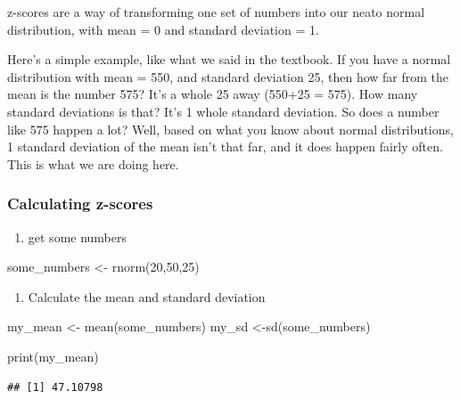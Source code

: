 \documentclass[
]{book}
\newenvironment{Shaded}{\begin{snugshade}}{\end{snugshade}}
\newcommand{\DecValTok}[1]{\textcolor[rgb]{0.00,0.00,0.81}{#1}}
\newcommand{\FunctionTok}[1]{\textcolor[rgb]{0.00,0.00,0.00}{#1}}
\newcommand{\NormalTok}[1]{#1}
\newcommand{\OtherTok}[1]{\textcolor[rgb]{0.56,0.35,0.01}{#1}}
\providecommand{\tightlist}{%
  \setlength{\itemsep}{0pt}\setlength{\parskip}{0pt}}
\begin{document}
z-scores are a way of transforming one set of numbers into our neato normal distribution, with mean = 0 and standard deviation = 1.

Here's a simple example, like what we said in the textbook. If you have a normal distribution with mean = 550, and standard deviation 25, then how far from the mean is the number 575? It's a whole 25 away (550+25 = 575). How many standard deviations is that? It's 1 whole standard deviation. So does a number like 575 happen a lot? Well, based on what you know about normal distributions, 1 standard deviation of the mean isn't that far, and it does happen fairly often. This is what we are doing here.

\hypertarget{calculating-z-scores}{%
\subsubsection{Calculating z-scores}\label{calculating-z-scores}}

\begin{enumerate}
\def\labelenumi{\arabic{enumi}.}
\tightlist
\item
  get some numbers
\end{enumerate}

\begin{Shaded}
\begin{Highlighting}[]
\NormalTok{some\_numbers }\OtherTok{\textless{}{-}} \FunctionTok{rnorm}\NormalTok{(}\DecValTok{20}\NormalTok{,}\DecValTok{50}\NormalTok{,}\DecValTok{25}\NormalTok{)}
\end{Highlighting}
\end{Shaded}

\begin{enumerate}
\def\labelenumi{\arabic{enumi}.}
\setcounter{enumi}{1}
\tightlist
\item
  Calculate the mean and standard deviation
\end{enumerate}

\begin{Shaded}
\begin{Highlighting}[]
\NormalTok{my\_mean }\OtherTok{\textless{}{-}} \FunctionTok{mean}\NormalTok{(some\_numbers)}
\NormalTok{my\_sd }\OtherTok{\textless{}{-}}\FunctionTok{sd}\NormalTok{(some\_numbers)}

\FunctionTok{print}\NormalTok{(my\_mean)}
\end{Highlighting}
\end{Shaded}

\begin{verbatim}
## [1] 47.10798
\end{verbatim}
\end{document}
